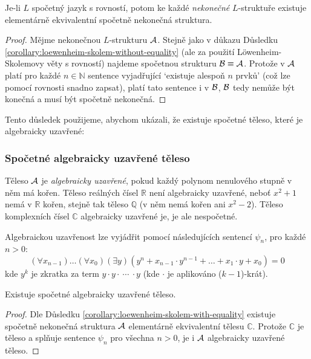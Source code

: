 \begin{corollary}\label{corollary:loewenheim-skolem-with-equality}
    Je-li $L$ spočetný jazyk s rovností, potom ke každé \emph{nekonečné} $L$-struktuře existuje elementárně ekvivalentní spočetně nekonečná struktura.
\end{corollary}
\begin{proof}
    Mějme nekonečnou $L$-strukturu $\mathcal{A}$. Stejně jako v důkazu Důsledku \ref{corollary:loewenheim-skolem-without-equality} (ale za použití Löwenheim-Skolemovy věty s rovností) najdeme spočetnou strukturu $\mathcal{B}\equiv\mathcal{A}$. Protože v $\mathcal{A}$ platí pro každé $n\in\mathbb N$ sentence vyjadřující `existuje alespoň $n$ prvků' (což lze pomocí rovnosti snadno zapsat), platí tato sentence i v $\mathcal{B}$, $\mathcal{B}$ tedy nemůže být konečná a musí být spočetně nekonečná.
\end{proof}

Tento důsledek použijeme, abychom ukázali, že existuje spočetné těleso, které je algebraicky uzavřené:  

\subsubsection*{Spočetné algebraicky uzavřené těleso}

Těleso $\mathcal{A}$ je \emph{algebraicky uzavřené}, pokud každý polynom nenulového stupně v něm má kořen. Těleso reálných čísel $\mathbb R$ není algebraicky uzavřené, neboť $x^2+1$ nemá v $\mathbb R$ kořen, stejně tak těleso $\mathbb Q$ (v něm nemá kořen ani $x^2-2$). Těleso komplexních čísel $\mathbb C$ algebraicky uzavřené je, je ale nespočetné.

Algebraickou uzavřenost lze vyjádřit pomocí následujících sentencí $\psi_n$, pro každé $n>0$:
$$
(\forall x_{n-1})\dots(\forall x_0)(\exists y)(y^n+x_{n-1}\cdot y^{n-1}+\dots+x_1\cdot y + x_0) = 0
$$
kde $y^k$ je zkratka za term $y\cdot y \cdot\ \cdots\ \cdot y$ (kde  $\cdot$ je aplikováno ($k-1$)-krát).

\begin{corollary}
    Existuje spočetné algebraicky uzavřené těleso.
\end{corollary}
\begin{proof}
    Dle Důsledku \ref{corollary:loewenheim-skolem-with-equality} existuje spočetně nekonečná struktura $\mathcal{A}$ elementárně ekvivalentní tělesu $\mathbb C$. Protože $\mathbb C$ je těleso a splňuje sentence $\psi_n$ pro všechna $n>0$, je i $\mathcal{A}$ algebraicky uzavřené těleso.
\end{proof}


